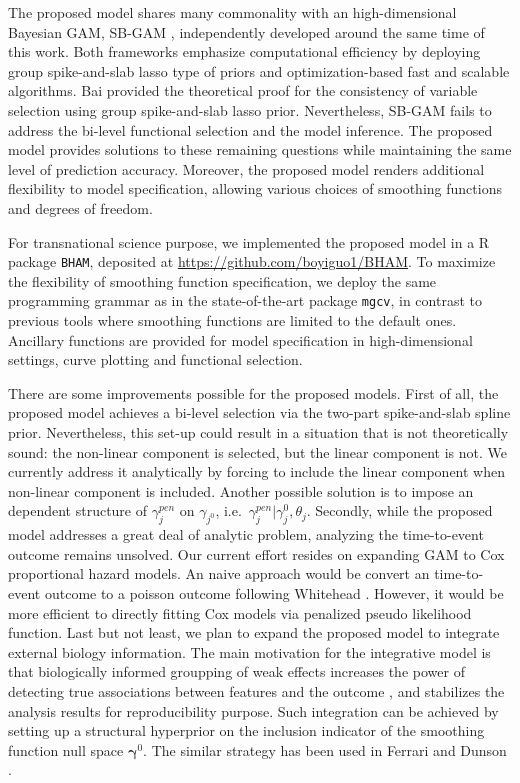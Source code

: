 \documentclass[AMA,STIX1COL,]{WileyNJD-v2}
\begin{document}
The proposed model shares many commonality with an high-dimensional
Bayesian GAM, SB-GAM \citep{Bai2021}, independently developed around the
same time of this work. Both frameworks emphasize computational
efficiency by deploying group spike-and-slab lasso type of priors and
optimization-based fast and scalable algorithms. Bai provided the
theoretical proof for the consistency of variable selection using group
spike-and-slab lasso prior. Nevertheless, SB-GAM fails to address the
bi-level functional selection and the model inference. The proposed
model provides solutions to these remaining questions while maintaining
the same level of prediction accuracy. Moreover, the proposed model
renders additional flexibility to model specification, allowing various
choices of smoothing functions and degrees of freedom.

For transnational science purpose, we implemented the proposed model in
a R package \texttt{BHAM}, deposited at
\url{https://github.com/boyiguo1/BHAM}. To maximize the flexibility of
smoothing function specification, we deploy the same programming grammar
as in the state-of-the-art package \texttt{mgcv}, in contrast to
previous tools where smoothing functions are limited to the default
ones. Ancillary functions are provided for model specification in
high-dimensional settings, curve plotting and functional selection.

There are some improvements possible for the proposed models. First of
all, the proposed model achieves a bi-level selection via the two-part
spike-and-slab spline prior. Nevertheless, this set-up could result in a
situation that is not theoretically sound: the non-linear component is
selected, but the linear component is not. We currently address it
analytically by forcing to include the linear component when non-linear
component is included. Another possible solution is to impose an
dependent structure of \(\gamma_{j}^{pen}\) on \(\gamma_{j^{0}}\),
i.e.~\(\gamma_j^{pen}|\gamma_{j}^{0}, \theta_j\). Secondly, while the
proposed model addresses a great deal of analytic problem, analyzing the
time-to-event outcome remains unsolved. Our current effort resides on
expanding GAM to Cox proportional hazard models. An naive approach would
be convert an time-to-event outcome to a poisson outcome following
Whitehead \citep{Whitehead1980}. However, it would be more efficient to
directly fitting Cox models via penalized pseudo likelihood function.
Last but not least, we plan to expand the proposed model to integrate
external biology information. The main motivation for the integrative
model is that biologically informed groupping of weak effects increases
the power of detecting true associations between features and the
outcome \citep{Peterson2016}, and stabilizes the analysis results for
reproducibility purpose. Such integration can be achieved by setting up
a structural hyperprior on the inclusion indicator of the smoothing
function null space \(\boldsymbol{\gamma}^0\). The similar strategy has
been used in Ferrari and Dunson \citep{Ferrari2020}.


\end{document}
